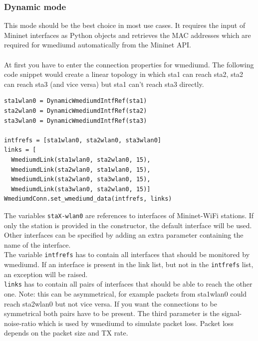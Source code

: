 \subsubsection{Dynamic mode}
This mode should be the best choice in most use cases. It requires the input of Mininet interfaces as Python objects and retrieves the MAC addresses which are required for wmediumd automatically from the Mininet API.\\
\\
At first you have to enter the connection properties for wmediumd. The following code snippet would create a linear topology in which sta1 can reach sta2, sta2 can reach sta3 (and vice versa) but sta1 can't reach sta3 directly.
\begin{verbatim}
sta1wlan0 = DynamicWmediumdIntfRef(sta1)
sta2wlan0 = DynamicWmediumdIntfRef(sta2)
sta3wlan0 = DynamicWmediumdIntfRef(sta3)

intfrefs = [sta1wlan0, sta2wlan0, sta3wlan0]
links = [
  WmediumdLink(sta1wlan0, sta2wlan0, 15),
  WmediumdLink(sta2wlan0, sta1wlan0, 15),
  WmediumdLink(sta2wlan0, sta3wlan0, 15),
  WmediumdLink(sta3wlan0, sta2wlan0, 15)]
WmediumdConn.set_wmediumd_data(intfrefs, links)
\end{verbatim}
The variables \texttt{staX-wlan0} are references to interfaces of Mininet-WiFi stations. If only the station is provided in the constructor, the default interface will be used. Other interfaces can be specified by adding an extra parameter containing the name of the interface.\\
The variable \texttt{intfrefs} has to contain all interfaces that should be monitored by wmediumd. If an interface is present in the link list, but not in the \texttt{intfrefs} list, an exception will be raised.\\
\texttt{links} has to contain all pairs of interfaces that should be able to reach the other one. Note: this can be asymmetrical, for example packets from sta1wlan0 could reach sta2wlan0 but not vice versa. If you want the connections to be symmetrical both pairs have to be present. The third parameter is the signal-noise-ratio which is used by wmediumd to simulate packet loss. Packet loss depends on the packet size and TX rate.\\
